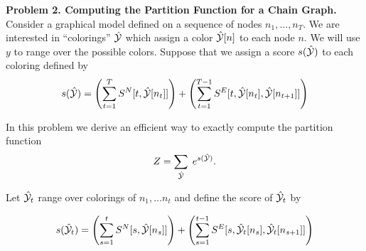 
    \bigskip
    {\bf Problem 2. Computing the Partition Function for a Chain Graph.}  Consider a graphical model defined on a sequence of nodes $n_1,\ldots,n_T$. We are
    interested in ``colorings'' $\hat{\cal Y}$ which assign a color $\hat{\cal Y}[n]$ to each node $n$. We will use $y$ to range over the possible colors.  Suppose that we assign a score
    $s(\hat{\cal Y})$ to each coloring defined by
    $$s(\hat{\cal Y}) = \left(\sum_{t = 1}^T S^N[t,\hat{\cal Y}[n_t]]\right) + \left(\sum_{t = 1}^{T-1} S^E[t,\hat{\cal Y}[n_t],\hat{\cal Y}[n_{t+1}]]\right)$$

    In this problem we derive an efficient way to exactly compute the partition function
    $$Z = \sum_{\hat{\cal Y}}\;e^{s(\hat{\cal Y})}.$$
    
    Let $\hat{\cal Y}_t$ range over colorings of $n_1,\ldots n_t$ and define the score of $\hat{{\cal Y}}_t$ by

    $$s(\hat{\cal Y}_t) = \left(\sum_{s = 1}^t S^N[s,\hat{\cal Y}[n_s]]\right) + \left(\sum_{s = 1}^{t-1} S^E[s,\hat{\cal Y}_t[n_s],\hat{\cal Y}_t[n_{s+1}]]\right)$$


